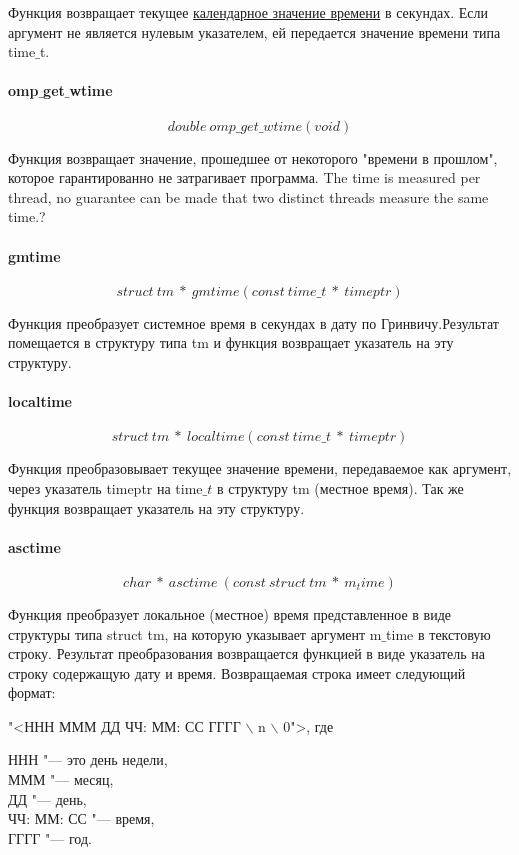 \documentclass{article}
\begin{document}
				Функция возвращает текущее \underline{календарное значение времени} в секундах. Если аргумент не является нулевым 			указателем, ей передается значение времени типа time$\_$t.
				
				
			\paragraph*{omp$\_$get$\_$wtime}
			$$double~omp\_get\_wtime(void)$$
				
				Функция возвращает значение, прошедшее от некоторого "времени в прошлом", которое гарантированно не затрагивает 				программа.  The time is measured per thread, no guarantee can be made that two distinct threads measure the same 					time.?
				
							
			\paragraph*{gmtime}	
			$$struct~tm~*~gmtime(const~time\_t~*~timeptr)$$
			
				Функция преобразует системное время в секундах в дату по Гринвичу.Результат помещается в структуру типа tm и 					функция возвращает указатель на эту структуру.
				
			\paragraph*{localtime}
			$$struct~tm~*~localtime(const~time\_t~*~timeptr)$$
			
				Функция преобразовывает текущее значение времени, передаваемое как аргумент, через указатель timeptr на time$\_t$ 			в структуру tm (местное время). Так же функция возвращает указатель на эту структуру.
			
			\paragraph*{asctime}
			$$char~*~asctime~(const~struct~tm~*~m_time)$$			
			
				Функция преобразует локальное (местное) время представленное в виде структуры типа struct tm, на которую 						указывает аргумент m$\_$time в текстовую строку. Результат преобразования возвращается функцией в виде указатель на 				строку содержащую дату и время. 
			Возвращаемая строка имеет следующий формат:
			\begin{center}
				"<ННН МММ ДД ЧЧ: ММ: СС ГГГГ $\backslash$ n $\backslash$ 0">, где\\
			\end{center}
			ННН "--- это день недели,\\
			МММ "--- месяц,\\
			ДД "--- день,\\
			ЧЧ: ММ: СС "--- время,\\
			ГГГГ "--- год.	
			
\end{document}
